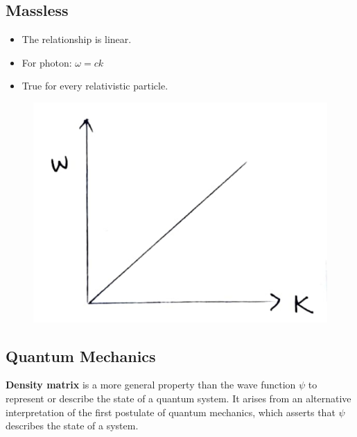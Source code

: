 \documentclass[14pt]{article} %
\begin{document}
\subsection*{Massless}
\begin{itemize}
    \item The relationship is linear.
    \item For photon: $\omega = ck$
    \item True for every relativistic particle.
\end{itemize}
\begin{figure}[H]
\centering
\includegraphics[width=0.45\linewidth]{L(-2)_2.jpg}
\caption*{}
\end{figure}
\vspace{-1cm}
\subsection{Quantum Mechanics}
\textbf{Density matrix} is a more general property than the wave function $\psi$ to represent or describe the state of a quantum system. It arises from an alternative interpretation of the first postulate of quantum mechanics, which asserts that $\psi$ describes the state of a system.
\end{document}
